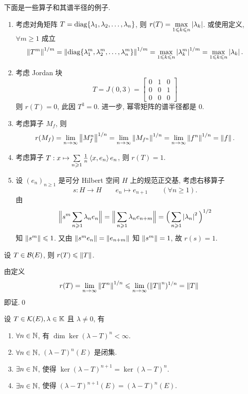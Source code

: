\begin{Example}
	下面是一些算子和其谱半径的例子.
	\begin{enumerate}[(1)]
		\item 考虑对角矩阵 $ T=\operatorname{diag}\{ \lambda_{1}, \lambda_{2}, \dots, \lambda_{n} \} $, 则 $ r(T)=\max\limits_{1\leqslant k\leqslant n}\left| \lambda_{k} \right|  $. 或使用定义, $ \forall m\geqslant1 $ 成立
		      \[
			      \left\| T^{m} \right\|^{1/m}=\left\| \operatorname{diag}\{ \lambda^{m}_{1}, \lambda^{m}_{2}, \dots, \lambda^{m}_{n} \} \right\|^{1/m}=\max_{1\leqslant k\leqslant n}\left| \lambda_{k}^{m} \right| ^{1/m}=\max_{1\leqslant k\leqslant n}\left| \lambda_{k} \right| .
		      \]
		\item 考虑 Jordan 块
		      \[
			      T = J(0, 3)=\begin{bmatrix}
				      0 & 1 & 0 \\
				      0 & 0 & 1 \\
				      0 & 0 & 0
			      \end{bmatrix}
		      \]
		      则 $ r(T)=0 $, 此因 $ T^{3}=0 $. 进一步, 幂零矩阵的谱半径都是 0.
		\item 考虑算子 $ M_{f} $, 则
		      \[
			      r(M_{f}) = \lim_{n\to\infty}\left\| M_{f}^{n} \right\|^{1/n}=\lim_{n\to\infty}\left\| M_{f^{n}} \right\|^{1/n}=\lim_{n\to\infty}\left\| f^{n} \right\|^{1/n}=\left\| f \right\|.
		      \]
		\item 考虑算子 $ T: x\mapsto\sum\limits_{n\geqslant1}\frac{1}{n}\left\langle x, e_{n} \right\rangle e_{n} $, 则 $ r(T)=1 $.
		\item 设 $ (e_{n})_{n\geqslant1} $ 是可分 Hilbert 空间 $ H $ 上的规范正交基, 考虑右移算子
		      \[
			      s: H\to H\qquad e_{n}\mapsto e_{n+1}\qquad (\forall n\geqslant1).
		      \]
		      由
		      \[
			      \Big\| s^{m}\sum_{n\geqslant1}\lambda_{n}e_{n} \Big\|=\Big\| \sum_{n\geqslant1}\lambda_{n}e_{n+m} \Big\|=\Big( \sum_{n\geqslant1}\left| \lambda_{n} \right| ^{2} \Big)^{1/2}
		      \]
		      知 $ \left\| s^{m} \right\|\leqslant1 $. 又由 $ \left\| s^{m}e_{n} \right\|=\left\| e_{n+m} \right\| $ 知 $ \left\| s^{m} \right\|=1 $, 故 $ r(s)=1 $.
	\end{enumerate}
\end{Example}

\begin{Corollary}
	设 $ T\in\mathcal{B}(E) $, 则 $ r(T)\leqslant\left\| T \right\| $.
\end{Corollary}
\begin{Proof}
	由定义
	\[
		r(T)=\lim_{n\to\infty}\left\| T^{n} \right\|^{1/n}\leqslant\lim_{n\to\infty}(\left\| T \right\|^{n})^{1/n}=\left\| T \right\|
	\]
	即证.\qed
\end{Proof}

\begin{Theorem}\label{thm:lambda-T的性质}
	设 $ T\in\mathcal{K}(E), \lambda\in\mathbb{K} $ 且 $ \lambda\ne0 $, 有
	\begin{enumerate}[(1)]
		\item $ \forall n\in\mathbb{N} $, 有 $ \dim\ker(\lambda-T)^{n}<\infty $.
		\item $ \forall n\in\mathbb{N} $, $ (\lambda-T)^{n}(E) $ 是闭集.
		\item $ \exists n\in\mathbb{N} $, 使得 $ \ker(\lambda-T)^{n+1}=\ker(\lambda-T)^{n} $.
		\item $ \exists n\in\mathbb{N} $, 使得 $ (\lambda-T)^{n+1}(E)=(\lambda-T)^{n}(E) $.
	\end{enumerate}
\end{Theorem}


